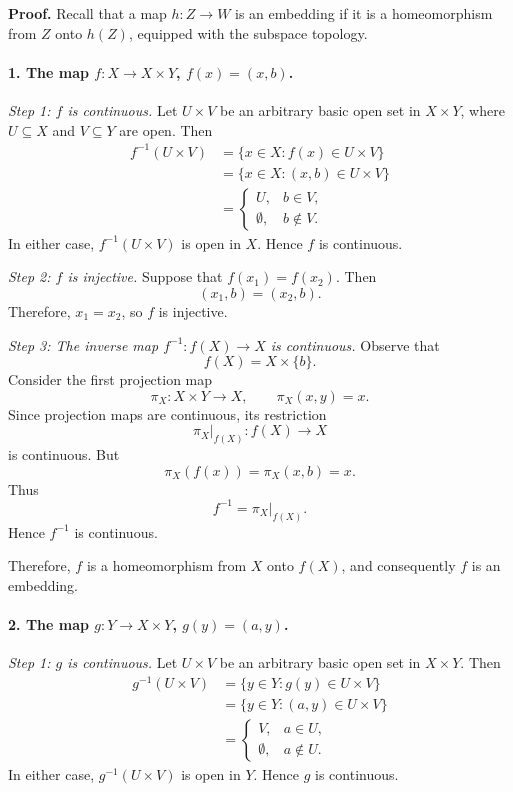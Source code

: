 
\textbf{Proof.}
Recall that a map $h\colon Z\to W$ is an embedding if it is a homeomorphism from $Z$ onto
$h(Z)$, equipped with the subspace topology.

\paragraph{1. The map $f\colon X\to X\times Y$, $f(x)=(x,b)$.}

\emph{Step 1: $f$ is continuous.}
Let $U\times V$ be an arbitrary basic open set in $X\times Y$, where $U\subseteq X$ and
$V\subseteq Y$ are open. Then
\begin{align*}
  f^{-1}(U\times V) &= \{x\in X : f(x)\in U\times V\}\\
                    &= \{x\in X : (x,b)\in U\times V\}\\
                    &= \begin{cases} U, & b\in V,\\ \emptyset, & b\notin V.\end{cases}
\end{align*}
In either case, $f^{-1}(U\times V)$ is open in $X$. Hence $f$ is continuous.

\emph{Step 2: $f$ is injective.}
Suppose that $f(x_1)=f(x_2)$. Then
\[ (x_1,b)=(x_2,b). \]
Therefore, $x_1=x_2$, so $f$ is injective.

\emph{Step 3: The inverse map $f^{-1}\colon f(X)\to X$ is continuous.}
Observe that
\[ f(X)=X\times\{b\}. \]
Consider the first projection map
\[ \pi_X\colon X\times Y\to X,\qquad \pi_X(x,y)=x. \]
Since projection maps are continuous, its restriction
\[ \pi_X|_{f(X)}\colon f(X)\to X \]
is continuous. But
\[ \pi_X(f(x))=\pi_X(x,b)=x. \]
Thus
\[ f^{-1}=\pi_X|_{f(X)}. \]
Hence $f^{-1}$ is continuous.

Therefore, $f$ is a homeomorphism from $X$ onto $f(X)$, and consequently $f$ is an embedding.

\paragraph{2. The map $g\colon Y\to X\times Y$, $g(y)=(a,y)$.}

\emph{Step 1: $g$ is continuous.}
Let $U\times V$ be an arbitrary basic open set in $X\times Y$. Then
\begin{align*}
  g^{-1}(U\times V) &= \{y\in Y : g(y)\in U\times V\}\\
                    &= \{y\in Y : (a,y)\in U\times V\}\\
                    &= \begin{cases} V, & a\in U,\\ \emptyset, & a\notin U.\end{cases}
\end{align*}
In either case, $g^{-1}(U\times V)$ is open in $Y$. Hence $g$ is continuous.

